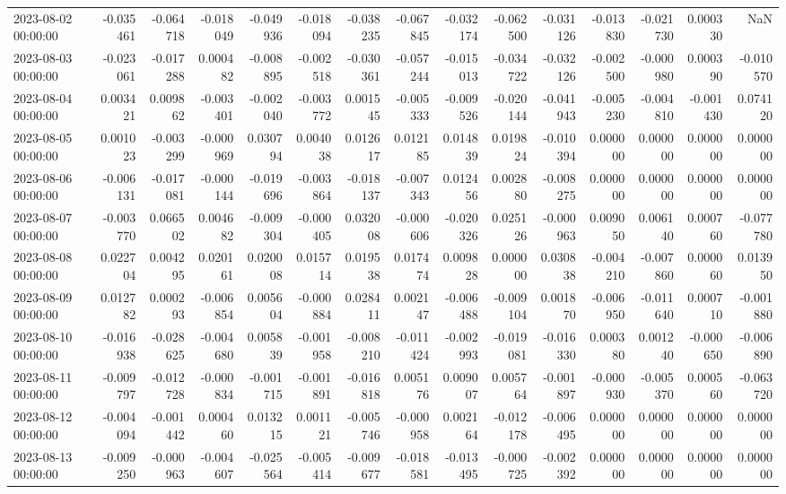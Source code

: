 \begin{tabular}{lrrrrrrrrrrrrrr}
2023-08-02 00:00:00 & -0.035461 & -0.064718 & -0.018049 & -0.049936 & -0.018094 & -0.038235 & -0.067845 & -0.032174 & -0.062500 & -0.031126 & -0.013830 & -0.021730 & 0.000330 & NaN \\
2023-08-03 00:00:00 & -0.023061 & -0.017288 & 0.000482 & -0.008895 & -0.002518 & -0.030361 & -0.057244 & -0.015013 & -0.034722 & -0.032126 & -0.002500 & -0.000980 & 0.000390 & -0.010570 \\
2023-08-04 00:00:00 & 0.003421 & 0.009862 & -0.003401 & -0.002040 & -0.003772 & 0.001545 & -0.005333 & -0.009526 & -0.020144 & -0.041943 & -0.005230 & -0.004810 & -0.001430 & 0.074120 \\
2023-08-05 00:00:00 & 0.001023 & -0.003299 & -0.000969 & 0.030794 & 0.004038 & 0.012617 & 0.012185 & 0.014839 & 0.019824 & -0.010394 & 0.000000 & 0.000000 & 0.000000 & 0.000000 \\
2023-08-06 00:00:00 & -0.006131 & -0.017081 & -0.000144 & -0.019696 & -0.003864 & -0.018137 & -0.007343 & 0.012456 & 0.002880 & -0.008275 & 0.000000 & 0.000000 & 0.000000 & 0.000000 \\
2023-08-07 00:00:00 & -0.003770 & 0.066502 & 0.004682 & -0.009304 & -0.000405 & 0.032008 & -0.000606 & -0.020326 & 0.025126 & -0.000963 & 0.009050 & 0.006140 & 0.000760 & -0.077780 \\
2023-08-08 00:00:00 & 0.022704 & 0.004295 & 0.020161 & 0.020008 & 0.015714 & 0.019538 & 0.017474 & 0.009828 & 0.000000 & 0.030838 & -0.004210 & -0.007860 & 0.000060 & 0.013950 \\
2023-08-09 00:00:00 & 0.012782 & 0.000293 & -0.006854 & 0.005604 & -0.000884 & 0.028411 & 0.002147 & -0.006488 & -0.009104 & 0.001870 & -0.006950 & -0.011640 & 0.000710 & -0.001880 \\
2023-08-10 00:00:00 & -0.016938 & -0.028625 & -0.004680 & 0.005839 & -0.001958 & -0.008210 & -0.011424 & -0.002993 & -0.019081 & -0.016330 & 0.000380 & 0.001240 & -0.000650 & -0.006890 \\
2023-08-11 00:00:00 & -0.009797 & -0.012728 & -0.000834 & -0.001715 & -0.001891 & -0.016818 & 0.005176 & 0.009007 & 0.005764 & -0.001897 & -0.000930 & -0.005370 & 0.000560 & -0.063720 \\
2023-08-12 00:00:00 & -0.004094 & -0.001442 & 0.000460 & 0.013215 & 0.001121 & -0.005746 & -0.000958 & 0.002164 & -0.012178 & -0.006495 & 0.000000 & 0.000000 & 0.000000 & 0.000000 \\
2023-08-13 00:00:00 & -0.009250 & -0.000963 & -0.004607 & -0.025564 & -0.005414 & -0.009677 & -0.018581 & -0.013495 & -0.000725 & -0.002392 & 0.000000 & 0.000000 & 0.000000 & 0.000000 \\

\end{tabular}
